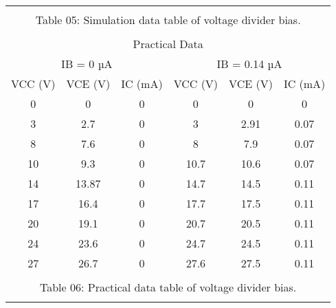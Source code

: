 \documentclass[a4paper, 12pt]{extarticle}
\begin{document}
\begin{table}[htbp]
\begin{tabular}{cccccc}
    \midrule
          &       &       &       &       &  \\
    \multicolumn{6}{c}{Table 05: Simulation data table of voltage divider bias.} \\
          &       &       &       &       &  \\
    \midrule
    \multicolumn{6}{|c|}{Practical Data} \\
    \midrule
    \multicolumn{3}{|c|}{IB = 0 µA} & \multicolumn{3}{c|}{IB = 0.14 µA} \\
    \midrule
    \multicolumn{1}{|c|}{VCC (V)} & \multicolumn{1}{c|}{VCE (V)} & \multicolumn{1}{c|}{IC (mA)} & \multicolumn{1}{c|}{VCC (V)} & \multicolumn{1}{c|}{VCE (V)} & \multicolumn{1}{c|}{IC (mA)} \\
    \midrule
    \multicolumn{1}{|c|}{0} & \multicolumn{1}{c|}{0} & \multicolumn{1}{c|}{0} & \multicolumn{1}{c|}{0} & \multicolumn{1}{c|}{0} & \multicolumn{1}{c|}{0} \\
    \midrule
    \multicolumn{1}{|c|}{3} & \multicolumn{1}{c|}{2.7} & \multicolumn{1}{c|}{0} & \multicolumn{1}{c|}{3} & \multicolumn{1}{c|}{2.91} & \multicolumn{1}{c|}{0.07} \\
    \midrule
    \multicolumn{1}{|c|}{8} & \multicolumn{1}{c|}{7.6} & \multicolumn{1}{c|}{0} & \multicolumn{1}{c|}{8} & \multicolumn{1}{c|}{7.9} & \multicolumn{1}{c|}{0.07} \\
    \midrule
    \multicolumn{1}{|c|}{10} & \multicolumn{1}{c|}{9.3} & \multicolumn{1}{c|}{0} & \multicolumn{1}{c|}{10.7} & \multicolumn{1}{c|}{10.6} & \multicolumn{1}{c|}{0.07} \\
    \midrule
    \multicolumn{1}{|c|}{14} & \multicolumn{1}{c|}{13.87} & \multicolumn{1}{c|}{0} & \multicolumn{1}{c|}{14.7} & \multicolumn{1}{c|}{14.5} & \multicolumn{1}{c|}{0.11} \\
    \midrule
    \multicolumn{1}{|c|}{17} & \multicolumn{1}{c|}{16.4} & \multicolumn{1}{c|}{0} & \multicolumn{1}{c|}{17.7} & \multicolumn{1}{c|}{17.5} & \multicolumn{1}{c|}{0.11} \\
    \midrule
    \multicolumn{1}{|c|}{20} & \multicolumn{1}{c|}{19.1} & \multicolumn{1}{c|}{0} & \multicolumn{1}{c|}{20.7} & \multicolumn{1}{c|}{20.5} & \multicolumn{1}{c|}{0.11} \\
    \midrule
    \multicolumn{1}{|c|}{24} & \multicolumn{1}{c|}{23.6} & \multicolumn{1}{c|}{0} & \multicolumn{1}{c|}{24.7} & \multicolumn{1}{c|}{24.5} & \multicolumn{1}{c|}{0.11} \\
    \midrule
    \multicolumn{1}{|c|}{27} & \multicolumn{1}{c|}{26.7} & \multicolumn{1}{c|}{0} & \multicolumn{1}{c|}{27.6} & \multicolumn{1}{c|}{27.5} & \multicolumn{1}{c|}{0.11} \\
    \midrule
          &       &       &       &       &  \\
    \multicolumn{6}{c}{Table 06: Practical data table of voltage divider bias.} \\
          &       &       &       &       &  \\
    \end{tabular}%
  \label{tab:addlabel}%
\end{table}%
\end{document}
